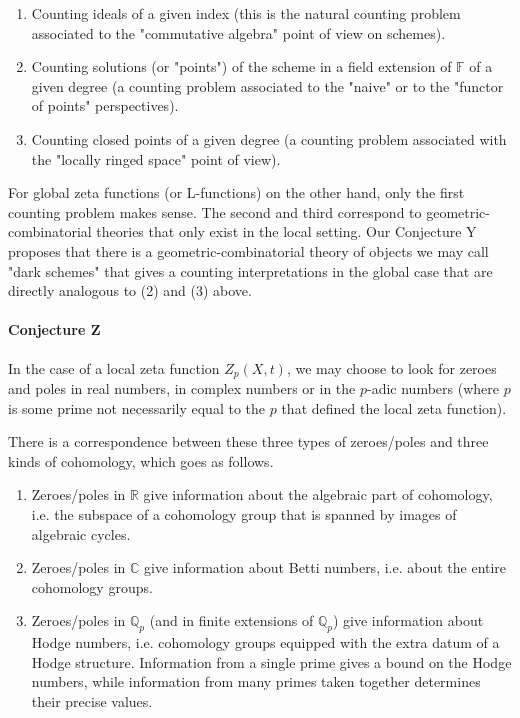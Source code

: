 \documentclass[paper=a4, fontsize=11pt]{scrartcl} %
\numberwithin{equation}{section} %
\numberwithin{figure}{section} %
\numberwithin{table}{section} %
\begin{document}
\begin{enumerate}
\item Counting ideals of a given index (this is the natural counting problem associated to the "commutative algebra" point of view on schemes).
\item Counting solutions (or "points") of the scheme in a field extension of $\mathbb{F}$ of a given degree (a counting problem associated to the "naive" or to the "functor of points" perspectives).
\item Counting closed points of a given degree (a counting problem associated with the "locally ringed space" point of view).
\end{enumerate}

For global zeta functions (or L-functions) on the other hand, only the first counting problem makes sense. The second and third correspond to geometric-combinatorial theories that only exist in the local setting. Our Conjecture Y proposes that there is a geometric-combinatorial theory of objects we may call "dark schemes" that gives a counting interpretations in the global case that are directly analogous to (2) and (3) above.

\paragraph{Conjecture Z}

In the case of a local zeta function $Z_p(X, t)$, we may choose to look for zeroes and poles in real numbers, in complex numbers or in the $p$-adic numbers (where $p$ is some prime not necessarily equal to the $p$ that defined the local zeta function).

There is a correspondence between these three types of zeroes/poles and three kinds of cohomology, which goes as follows.

\begin{enumerate}
\item Zeroes/poles in $\mathbb{R}$ give information about the algebraic part of cohomology, i.e. the subspace of a cohomology group that is spanned by images of algebraic cycles.
\item Zeroes/poles in $\mathbb{C}$ give information about Betti numbers, i.e. about the entire cohomology groups.
\item Zeroes/poles in $\mathbb{Q}_p$ (and in finite extensions of $\mathbb{Q}_p$) give information about Hodge numbers, i.e. cohomology groups equipped with the extra datum of a Hodge structure. Information from a single prime gives a bound on the Hodge numbers, while information from many primes taken together determines their precise values.
\end{enumerate}
\end{document}
